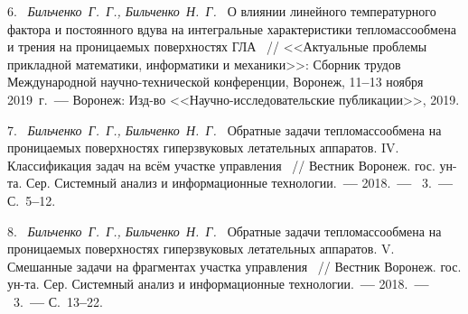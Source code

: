 6.~%
\textit%
{Бильченко~Г.~Г.,  
 Бильченко~Н.~Г.~}  
{%
  {О  влиянии  линейного  температурного  фактора 
и  постоянного  вдува 
на  интегральные  характеристики  тепломассообмена  
и  трения 
на  проницаемых  поверхностях 
ГЛА}%
~/$\!$/  
  <<Актуальные  проблемы  
   прикладной  математики,  информатики  
   и  механики>>:  
  Сборник  трудов  Международной  
  научно-технической  конференции,  
  Воронеж,  
  11{\textbf{--}}13  
  ноября  2019~г.~{\textbf{---}}  
  Воронеж:  
  Изд-во  <<На\-уч\-но-исследовательские  публикации>>,  
  2019.%
  }



7.~%
\textit%
{Бильченко~Г.~Г.,  
 Бильченко~Н.~Г.~}  
{%
  {Обратные  задачи  тепломассообмена 
   на  проницаемых  поверхностях  
   гиперзвуковых  летательных  аппаратов. 
  IV.  Классификация  задач  
   на  всём  участке  управления}%
~/$\!$/  
  Вестник  Воронеж.  гос.  ун-та. 
  Сер.  Системный  анализ  
  и  информационные  технологии.~{\textbf{---}}  
  2018.~{\textbf{---}}  
  \No~3.~{\textbf{---}}  
  С.~5{\textbf{--}}12.%
  }  



8.~%
\textit%
{Бильченко~Г.~Г.,  
 Бильченко~Н.~Г.~}  
{%
  {Обратные  задачи  тепломассообмена 
   на  проницаемых  поверхностях  
   гиперзвуковых  летательных  аппаратов. 
   V.  Смешанные  задачи  
   на  фрагментах  участка  управления}%
~/$\!$/  
  Вестник  Воронеж.  гос.  ун-та. 
  Сер.  Системный  анализ  
  и  информационные  технологии.~{\textbf{---}}  
  2018.~{\textbf{---}}  
  \No~3.~{\textbf{---}}  
  С.~13{\textbf{--}}22.%
  }  



